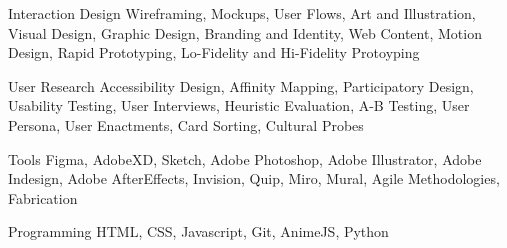 

\begin{cvskills}

  \cvskill
    {Interaction Design} %
    {Wireframing, Mockups, User Flows, Art and Illustration, Visual Design, Graphic Design, Branding and Identity, Web Content, Motion Design, Rapid Prototyping, Lo-Fidelity  and Hi-Fidelity Protoyping} %

	\cvskill
	{User Research} %
	{Accessibility Design, Affinity Mapping, Participatory Design, Usability Testing, User Interviews, Heuristic Evaluation, A-B Testing, User Persona, User Enactments, Card Sorting, Cultural Probes} %


	\cvskill
    {Tools} %
    {Figma, AdobeXD, Sketch, Adobe Photoshop, Adobe Illustrator, Adobe Indesign, Adobe AfterEffects, Invision, Quip, Miro, Mural, Agile Methodologies, Fabrication} %

	\cvskill
    {Programming} %
    {HTML, CSS, Javascript, Git, AnimeJS, Python} %


\end{cvskills}
